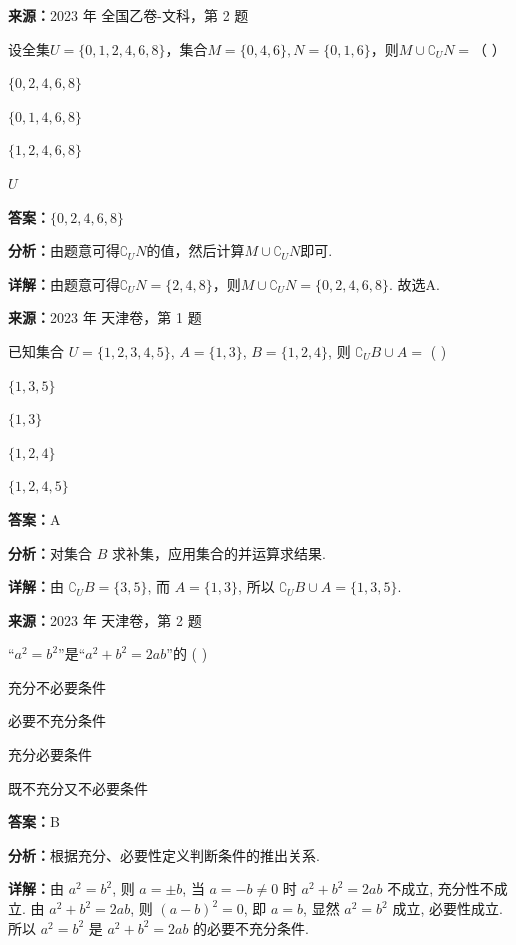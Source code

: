 \begin{question}[points=5]
\textbf{来源：}2023 年 全国乙卷-文科，第 2 题\par
设全集$U=\{0,1,2,4,6,8\}$，集合$M=\{0,4,6\}, N=\{0,1,6\}$，则$M\cup \complement_U N =$（   ）
\begin{choices}
  \item $\{0,2,4,6,8\}$
  \item $\{0,1,4,6,8\}$
  \item $\{1,2,4,6,8\}$
  \item $U$
\end{choices}
\begin{solution}
\textbf{答案：}$\{0,2,4,6,8\}$

\textbf{分析：}由题意可得$\complement_U N$的值，然后计算$M\cup \complement_U N$即可.

\textbf{详解：}由题意可得$\complement_U N = \{2,4,8\}$，则$M\cup \complement_U N = \{0,2,4,6,8\}$. 故选A.
\end{solution}
\end{question}

\begin{question}[points=5]
\textbf{来源：}2023 年 天津卷，第 1 题\par
已知集合 $U = \{1, 2, 3, 4, 5\}$, $A = \{1, 3\}$, $B = \{1, 2, 4\}$, 则 $\complement_U B \cup A =$ ( )
\begin{choices}
  \item $\{1,3,5\}$
  \item $\{1,3\}$
  \item $\{1,2,4\}$
  \item $\{1,2,4,5\}$
\end{choices}
\begin{solution}
\textbf{答案：}A

\textbf{分析：}对集合 $B$ 求补集，应用集合的并运算求结果.

\textbf{详解：}由 $\complement_U B = \{3,5\}$, 而 $A = \{1,3\}$, 所以 $\complement_U B \cup A = \{1,3,5\}$.
\end{solution}
\end{question}

\begin{question}[points=5]
\textbf{来源：}2023 年 天津卷，第 2 题\par
“$a^2 = b^2$”是“$a^2 + b^2 = 2ab$”的 ( )
\begin{choices}
  \item 充分不必要条件
  \item 必要不充分条件
  \item 充分必要条件
  \item 既不充分又不必要条件
\end{choices}
\begin{solution}
\textbf{答案：}B

\textbf{分析：}根据充分、必要性定义判断条件的推出关系.

\textbf{详解：}由 $a^2 = b^2$, 则 $a = \pm b$, 当 $a = -b \neq 0$ 时 $a^2 + b^2 = 2ab$ 不成立, 充分性不成立. 由 $a^2 + b^2 = 2ab$, 则 $(a-b)^2 = 0$, 即 $a = b$, 显然 $a^2 = b^2$ 成立, 必要性成立. 所以 $a^2 = b^2$ 是 $a^2 + b^2 = 2ab$ 的必要不充分条件.
\end{solution}
\end{question}


